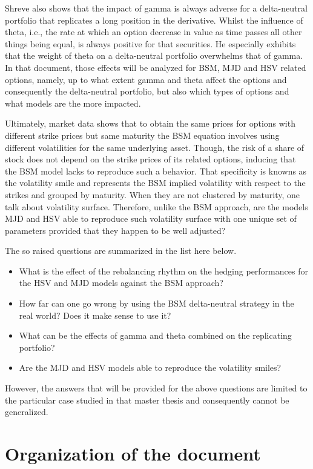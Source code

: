 \documentclass[12pt,a4paper]{report}
\begin{document}
Shreve also shows that the impact of gamma is always adverse for a delta-neutral portfolio that replicates a long position in the derivative. 
Whilst the influence of theta, i.e., the rate at which an option decrease in value as time passes all other things being equal, is always positive for that securities.
He especially exhibits that the weight of theta on a delta-neutral portfolio overwhelms that of gamma. 
In that document, those effects will be analyzed for BSM, MJD and HSV related options, namely, up to what extent gamma and theta affect the options and consequently the delta-neutral portfolio, but also which types of options and what models are the more impacted.

Ultimately, market data shows that to obtain the same prices for options with different strike prices but same maturity the BSM equation involves using different volatilities for the same underlying asset.
Though, the risk of a share of stock does not depend on the strike prices of its related options, inducing that the BSM model lacks to reproduce such a behavior.
That specificity is knowns as the volatility smile and represents the BSM implied volatility with respect to the strikes and grouped by maturity.
When they are not clustered by maturity, one talk about volatility surface.
Therefore, unlike the BSM approach, are the models MJD and HSV able to reproduce such volatility surface with one unique set of parameters provided that they happen to be well adjusted?

The so raised questions are summarized in the list here below.

\begin{itemize}
\item What is the effect of the rebalancing rhythm on the hedging performances for the HSV and MJD models against the BSM approach? 
\item How far can one go wrong by using the BSM delta-neutral strategy in the real world? Does it make sense to use it?
\item What can be the effects of gamma and theta combined on the replicating portfolio?
\item Are the MJD and HSV models able to reproduce the volatility smiles? 
\end{itemize}

However, the answers that will be provided for the above questions are limited to the particular case studied in that master thesis and consequently cannot be generalized.


\section{Organization of the document}
\label{sec:introduction:organization}
\end{document}
